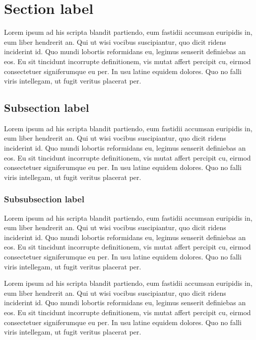 \documentclass{UGA_Report}
\author{Sergio Vinagrero Gutierrez} %
\begin{document}
\maintitle

\printcontents

\section{Section label}\label{section_label}
Lorem ipsum ad his scripta blandit partiendo, eum fastidii accumsan euripidis in, eum liber hendrerit an. Qui ut wisi vocibus suscipiantur,
quo dicit ridens inciderint id. Quo mundi lobortis reformidans eu, legimus senserit definiebas an eos. Eu sit tincidunt incorrupte definitionem,
vis mutat affert percipit cu, eirmod consectetuer signiferumque eu per. In usu latine equidem dolores. Quo no falli viris intellegam, ut fugit
veritus placerat per.

\subsection{Subsection label}
Lorem ipsum ad his scripta blandit partiendo, eum fastidii accumsan euripidis in, eum liber hendrerit an. Qui ut wisi vocibus suscipiantur,
quo dicit ridens inciderint id. Quo mundi lobortis reformidans eu, legimus senserit definiebas an eos. Eu sit tincidunt incorrupte definitionem,
vis mutat affert percipit cu, eirmod consectetuer signiferumque eu per. In usu latine equidem dolores. Quo no falli viris intellegam, ut fugit
veritus placerat per.

\subsubsection{Subsubsection label}
Lorem ipsum ad his scripta blandit partiendo, eum fastidii accumsan euripidis in, eum liber hendrerit an. Qui ut wisi vocibus suscipiantur,
quo dicit ridens inciderint id. Quo mundi lobortis reformidans eu, legimus senserit definiebas an eos. Eu sit tincidunt incorrupte definitionem,
vis mutat affert percipit cu, eirmod consectetuer signiferumque eu per. In usu latine equidem dolores. Quo no falli viris intellegam, ut fugit
veritus placerat per.

Lorem ipsum ad his scripta blandit partiendo, eum fastidii accumsan euripidis in, eum liber hendrerit an. Qui ut wisi vocibus suscipiantur,
quo dicit ridens inciderint id. Quo mundi lobortis reformidans eu, legimus senserit definiebas an eos. Eu sit tincidunt incorrupte definitionem,
vis mutat affert percipit cu, eirmod consectetuer signiferumque eu per. In usu latine equidem dolores. Quo no falli viris intellegam, ut fugit
veritus placerat per.\\
\end{document}
